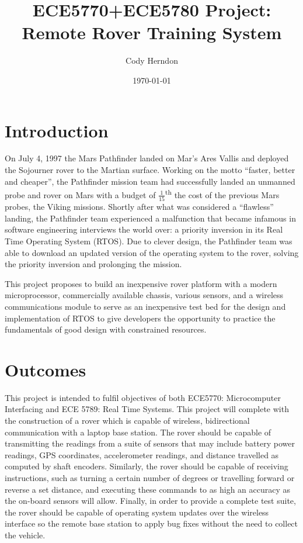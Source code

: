 \documentclass[dvips,12pt]{article}
\begin{document}
\title{ECE5770+ECE5780 Project:\\Remote Rover Training System}
\author{Cody Herndon}
\date{\today}

\maketitle

\section{Introduction}

On July 4, 1997 the Mars Pathfinder landed on Mar's Ares Vallis and deployed the Sojourner rover to the Martian surface.  Working on the motto ``faster, better and cheaper'', the Pathfinder mission team had successfully landed an unmanned probe and rover on Mars with a budget of $\frac{1}{15}$\textsuperscript{th} the cost of the previous Mars probes, the Viking missions.  Shortly after what was considered a ``flawless'' landing, the Pathfinder team experienced a malfunction that became infamous in software engineering interviews the world over: a priority inversion in its Real Time Operating System (RTOS).  Due to clever design, the Pathfinder team was able to download an updated version of the operating system to the rover, solving the priority inversion and prolonging the mission.

This project proposes to build an inexpensive rover platform with a modern microprocessor, commercially available chassis, various sensors, and a wireless communications module to serve as an inexpensive test bed for the design and implementation of RTOS to give developers the opportunity to practice the fundamentals of good design with constrained resources.

\section{Outcomes}

This project is intended to fulfil objectives of both ECE5770: Microcomputer Interfacing and ECE 5789: Real Time Systems.  This project will complete with the construction of a rover which is capable of wireless, bidirectional communication with a laptop base station.  The rover should be capable of transmitting the readings from a suite of sensors that may include battery power readings, GPS coordinates, accelerometer readings, and distance travelled as computed by shaft encoders.  Similarly, the rover should be capable of receiving instructions, such as turning a certain number of degrees or travelling forward or reverse a set distance, and executing these commands to as high an accuracy as the on-board sensors will allow.  Finally, in order to provide a complete test suite, the rover should be capable of operating system updates over the wireless interface so the remote base station to apply bug fixes without the need to collect the vehicle.
\end{document}
